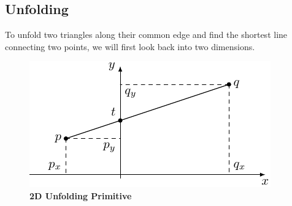 \documentclass{stdlocal}
\begin{document}
\subsection{Unfolding} %
\label{sub:unfolding}
To unfold two triangles along their common edge and find the shortest line connecting two points, we will first look back into two dimensions.

\begin{figure}[h]
  \centering
  \includegraphics[width=0.6\linewidth]{figures/unfolding_geodesic_2d.pdf}
  \caption[2D Unfolding Primitive]{%
    \textbf{2D Unfolding Primitive}
  }
\end{figure}
\end{document}
